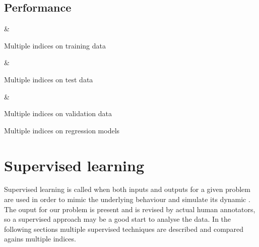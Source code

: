 \documentclass[journal]{IEEEtran}
\begin{document}
\subsection{Performance}

\begin{table}
    \hfill
    \begin{subtable}{0.45\linewidth}
        {\csvcoli & \csvcolii}%
        \caption{Multiple indices on training data\label{tab:regression:index:train}}
    \end{subtable}
    \hfill%
    \begin{subtable}{0.45\linewidth}
        {\csvcoli & \csvcolii}%
        \caption{Multiple indices on test data\label{tab:regression:index:test}}
    \end{subtable}
    \hfill

    \begin{subtable}{\linewidth}
        {\csvcoli & \csvcolii}%
        \caption{Multiple indices on validation data\label{tab:regression:index:validation}}
    \end{subtable}
    \caption{Multiple indices on regression models\label{tab:regression:index}}
\end{table}


\section{Supervised learning\label{sec:supervised}} 

Supervised learning is called when both inputs and outputs for a given problem
are used in order to mimic the underlying behaviour and simulate its dynamic
\cite{supervised:definition:rusell}. The ouput for our problem is present and is
revised by actual human annotators, so a supervised approach may be a good start
to analyse the data. In the following sections multiple supervised techniques
are described and compared agains multiple indices.
\end{document}
